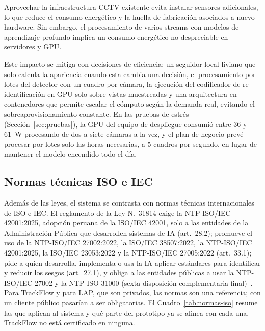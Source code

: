 \documentclass[12pt,a4paper]{article}
\begin{document}
Aprovechar la infraestructura CCTV existente evita instalar sensores
adicionales, lo que reduce el consumo energético y la huella de
fabricación asociados a nuevo hardware. Sin embargo, el procesamiento de
varios streams con modelos de aprendizaje profundo implica un consumo
energético no despreciable en servidores y GPU.

Este impacto se mitiga con decisiones de eficiencia: un seguidor local
liviano que solo calcula la apariencia cuando esta cambia una decisión,
el procesamiento por lotes del detector con un cuadro por cámara, la
ejecución del codificador de re-identificación en GPU solo sobre vistas
muestreadas y una arquitectura en contenedores que permite escalar el
cómputo según la demanda real, evitando el sobreaprovisionamiento
constante. En las pruebas de estrés (Sección~\ref{sec:pruebas}), la GPU del
equipo de despliegue consumió entre 36 y 61~W procesando de dos a siete
cámaras a la vez, y el plan de negocio prevé procesar por lotes solo las horas
necesarias, a 5 cuadros por segundo, en lugar de mantener el modelo encendido
todo el día.

\subsection{Normas técnicas ISO e IEC}
\label{sec:normas-iso}

Además de las leyes, el sistema se contrasta con normas técnicas
internacionales de ISO e IEC. El reglamento de la Ley N.\textdegree~31814 exige
la NTP-ISO/IEC 42001:2025, adopción peruana de la ISO/IEC 42001, solo a las
entidades de la Administración Pública que desarrollen sistemas de IA
(art.~28.2); promueve el uso de la NTP-ISO/IEC 27002:2022, la ISO/IEC
38507:2022, la NTP-ISO/IEC 42001:2025, la ISO/IEC 23053:2022 y la NTP-ISO/IEC
27005:2022 (art.~33.1); pide a quien desarrolla, implementa o usa la IA aplicar
estándares para identificar y reducir los sesgos (art.~27.1), y obliga a las
entidades públicas a usar la NTP-ISO/IEC 27002 y la NTP-ISO 31000 (sexta
disposición complementaria final)~\cite{ds115}. Para TrackFlow y para LAP,
que son privados, las normas son una referencia; con un cliente público
pasarían a ser obligatorias. El Cuadro~\ref{tab:normas-iso} resume las que
aplican al sistema y qué parte del prototipo ya se alinea con cada una.
TrackFlow no está certificado en ninguna.
\end{document}
